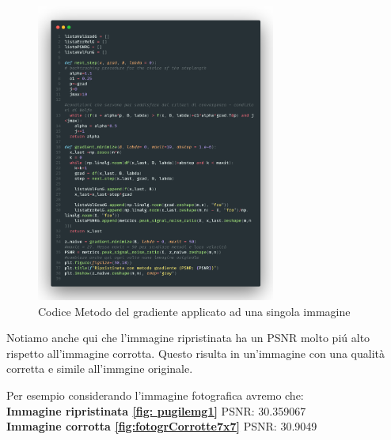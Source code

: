 \begin{figure}[H]
    \centering
    \includegraphics[width=0.7\textwidth]{imgCode/metGrad.png}
    \caption{Codice Metodo del gradiente applicato ad una singola immagine}
\end{figure}

Notiamo anche qui che l'immagine ripristinata ha un PSNR molto piú alto rispetto all'immagine corrotta. 
Questo risulta in un'immagine con una qualità corretta e simile all'immgine originale.

Per esempio considerando l'immagine fotografica avremo che:\\
\textbf{Immagine ripristinata \ref{fig: pugilemg1}} PSNR: 30.359067\\
\textbf{Immagine corrotta \ref{fig:fotogrCorrotte7x7}} PSNR: 30.9049\\
